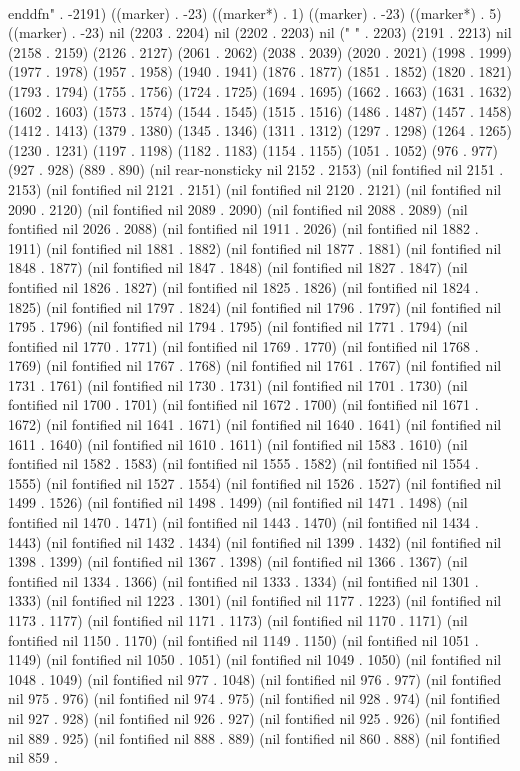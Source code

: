 \\end{dfn}" . -2191) ((marker) . -23) ((marker*) . 1) ((marker) . -23) ((marker*) . 5) ((marker) . -23) nil (2203 . 2204) nil (2202 . 2203) nil (" " . 2203) (2191 . 2213) nil (2158 . 2159) (2126 . 2127) (2061 . 2062) (2038 . 2039) (2020 . 2021) (1998 . 1999) (1977 . 1978) (1957 . 1958) (1940 . 1941) (1876 . 1877) (1851 . 1852) (1820 . 1821) (1793 . 1794) (1755 . 1756) (1724 . 1725) (1694 . 1695) (1662 . 1663) (1631 . 1632) (1602 . 1603) (1573 . 1574) (1544 . 1545) (1515 . 1516) (1486 . 1487) (1457 . 1458) (1412 . 1413) (1379 . 1380) (1345 . 1346) (1311 . 1312) (1297 . 1298) (1264 . 1265) (1230 . 1231) (1197 . 1198) (1182 . 1183) (1154 . 1155) (1051 . 1052) (976 . 977) (927 . 928) (889 . 890) (nil rear-nonsticky nil 2152 . 2153) (nil fontified nil 2151 . 2153) (nil fontified nil 2121 . 2151) (nil fontified nil 2120 . 2121) (nil fontified nil 2090 . 2120) (nil fontified nil 2089 . 2090) (nil fontified nil 2088 . 2089) (nil fontified nil 2026 . 2088) (nil fontified nil 1911 . 2026) (nil fontified nil 1882 . 1911) (nil fontified nil 1881 . 1882) (nil fontified nil 1877 . 1881) (nil fontified nil 1848 . 1877) (nil fontified nil 1847 . 1848) (nil fontified nil 1827 . 1847) (nil fontified nil 1826 . 1827) (nil fontified nil 1825 . 1826) (nil fontified nil 1824 . 1825) (nil fontified nil 1797 . 1824) (nil fontified nil 1796 . 1797) (nil fontified nil 1795 . 1796) (nil fontified nil 1794 . 1795) (nil fontified nil 1771 . 1794) (nil fontified nil 1770 . 1771) (nil fontified nil 1769 . 1770) (nil fontified nil 1768 . 1769) (nil fontified nil 1767 . 1768) (nil fontified nil 1761 . 1767) (nil fontified nil 1731 . 1761) (nil fontified nil 1730 . 1731) (nil fontified nil 1701 . 1730) (nil fontified nil 1700 . 1701) (nil fontified nil 1672 . 1700) (nil fontified nil 1671 . 1672) (nil fontified nil 1641 . 1671) (nil fontified nil 1640 . 1641) (nil fontified nil 1611 . 1640) (nil fontified nil 1610 . 1611) (nil fontified nil 1583 . 1610) (nil fontified nil 1582 . 1583) (nil fontified nil 1555 . 1582) (nil fontified nil 1554 . 1555) (nil fontified nil 1527 . 1554) (nil fontified nil 1526 . 1527) (nil fontified nil 1499 . 1526) (nil fontified nil 1498 . 1499) (nil fontified nil 1471 . 1498) (nil fontified nil 1470 . 1471) (nil fontified nil 1443 . 1470) (nil fontified nil 1434 . 1443) (nil fontified nil 1432 . 1434) (nil fontified nil 1399 . 1432) (nil fontified nil 1398 . 1399) (nil fontified nil 1367 . 1398) (nil fontified nil 1366 . 1367) (nil fontified nil 1334 . 1366) (nil fontified nil 1333 . 1334) (nil fontified nil 1301 . 1333) (nil fontified nil 1223 . 1301) (nil fontified nil 1177 . 1223) (nil fontified nil 1173 . 1177) (nil fontified nil 1171 . 1173) (nil fontified nil 1170 . 1171) (nil fontified nil 1150 . 1170) (nil fontified nil 1149 . 1150) (nil fontified nil 1051 . 1149) (nil fontified nil 1050 . 1051) (nil fontified nil 1049 . 1050) (nil fontified nil 1048 . 1049) (nil fontified nil 977 . 1048) (nil fontified nil 976 . 977) (nil fontified nil 975 . 976) (nil fontified nil 974 . 975) (nil fontified nil 928 . 974) (nil fontified nil 927 . 928) (nil fontified nil 926 . 927) (nil fontified nil 925 . 926) (nil fontified nil 889 . 925) (nil fontified nil 888 . 889) (nil fontified nil 860 . 888) (nil fontified nil 859 . 